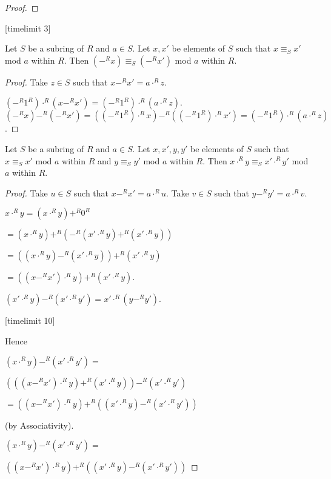 \documentclass[11pt]{article}
\begin{document}
\begin{forthel}
\begin{proof}
\end{proof}
[timelimit 3]

\begin{lemma}
Let $S$ be a subring of $R$ and $a \in S$.
Let $x,x'$ be elements of $S$ such that
$x \equiv_{S} x'$ mod $a$ within $R$. 
Then $(-^{R}x) \equiv_{S} (-^{R}x')$ mod $a$ within $R$.
\end{lemma}
\begin{proof}
Take $z \in S$ such that $x -^{R} x' = a \cdot^{R} z$.

$(-^{R} 1^{R}) \cdot^{R} (x -^{R} x') = (-^{R} 1^{R}) \cdot^{R} (a \cdot^{R} z)$.
$(-^{R}x) -^{R} (-^{R}x') =
((-^{R} 1^{R}) \cdot^{R} x) -^{R} ((-^{R} 1^{R}) \cdot^{R} x') =
(-^{R} 1^{R}) \cdot^{R} (a \cdot^{R} z)$.
\end{proof}

\begin{lemma}
Let $S$ be a subring of $R$ and $a \in S$.
Let $x,x',y,y'$ be elements of $S$ such that
$x \equiv_{S} x'$ mod $a$ within $R$
and $y \equiv_{S} y'$ mod $a$ within $R$. 
Then $x \cdot^{R} y \equiv_{S} x' \cdot^{R} y'$ mod $a$ within $R$.
\end{lemma}
\begin{proof}
Take $u \in S$ such that $x -^{R} x' = a \cdot^{R} u$.
Take $v \in S$ such that $y -^{R} y' = a \cdot^{R} v$.

$x \cdot^{R} y = (x \cdot^{R} y) +^{R} 0^{R}$

$= (x \cdot^{R} y) +^{R} (-^{R} (x' \cdot^{R} y) +^{R} (x' \cdot^{R} y))$

$= ((x \cdot^{R} y) -^{R} (x' \cdot^{R} y)) +^{R} (x' \cdot^{R} y)$

$= ((x -^{R} x') \cdot^{R} y) +^{R} (x' \cdot^{R} y)$.


$(x' \cdot^{R} y) -^{R} (x' \cdot^{R} y') = x' \cdot^{R} (y -^{R} y')$.

[timelimit 10]

Hence

$(x \cdot^{R} y) -^{R} (x' \cdot^{R} y') = $
 
$ (((x -^{R} x') \cdot^{R} y) +^{R} (x' \cdot^{R} y)) -^{R} (x' \cdot^{R} y')$ 

$ = ((x -^{R} x') \cdot^{R} y) +^{R} ((x' \cdot^{R} y) -^{R} (x' \cdot^{R} y'))$

(by Associativity).

$(x \cdot^{R} y) -^{R} (x' \cdot^{R} y') = $

$((x -^{R} x') \cdot^{R} y) +^{R} ((x' \cdot^{R} y) -^{R} (x' \cdot^{R} y'))$ 


\end{proof}
\end{forthel}
\end{document}
